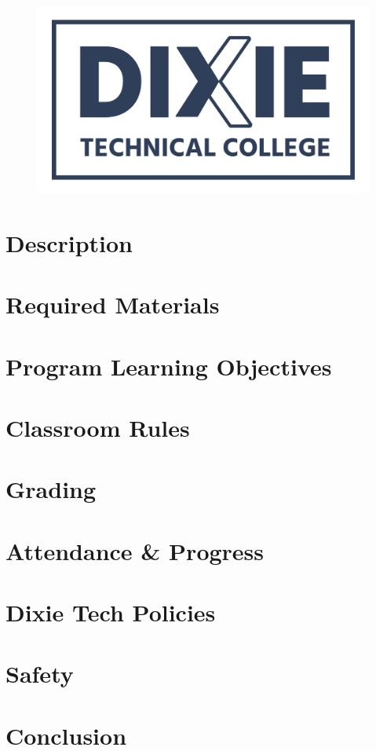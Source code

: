 \documentclass{article}
\begin{document}
\begin{figure}[h]
    \centering
    \includegraphics[scale=0.7]{../program/dtlogo.png}
\end{figure}


\section*{Description}
\bline


\section*{Required Materials}


\section*{Program Learning Objectives}


\section*{Classroom Rules}


\section*{Grading}
\bline


\section*{Attendance \& Progress}
\bline


\section*{Dixie Tech Policies}
\bline


\section*{Safety}
\bline


\section*{Conclusion}
\bline

\end{document}
